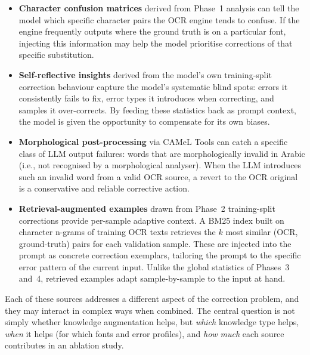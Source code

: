 \begin{itemize}

  \item \textbf{Character confusion matrices} derived from Phase~1 analysis
  can tell the model which specific character pairs the OCR engine tends to
  confuse. If the engine frequently outputs  where the ground truth is
   on a particular font, injecting this information may help the model
  prioritise corrections of that specific substitution.

  \item \textbf{Self-reflective insights} derived from the model's own
  training-split correction behaviour capture the model's systematic blind
  spots: errors it consistently fails to fix, error types it introduces when
  correcting, and samples it over-corrects. By feeding these statistics back
  as prompt context, the model is given the opportunity to compensate for its
  own biases.

  \item \textbf{Morphological post-processing} via CAMeL Tools can catch
  a specific class of LLM output failures: words that are morphologically
  invalid in Arabic (i.e., not recognised by a morphological analyser).
  When the LLM introduces such an invalid word from a valid OCR source,
  a revert to the OCR original is a conservative and reliable corrective action.

  \item \textbf{Retrieval-augmented examples} drawn from Phase~2
  training-split corrections provide per-sample adaptive context.
  A BM25 index built on character n-grams of training OCR texts retrieves
  the $k$ most similar (OCR, ground-truth) pairs for each validation sample.
  These are injected into the prompt as concrete correction exemplars,
  tailoring the prompt to the specific error pattern of the current input.
  Unlike the global statistics of Phases~3 and~4, retrieved examples adapt
  sample-by-sample to the input at hand.

\end{itemize}

Each of these sources addresses a different aspect of the correction
problem, and they may interact in complex ways when combined. The central
question is not simply whether knowledge augmentation helps, but \emph{which}
knowledge type helps, \emph{when} it helps (for which fonts and error
profiles), and \emph{how much} each source contributes in an ablation study.


